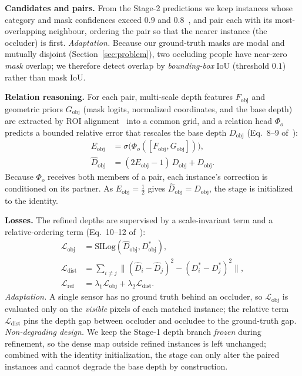 \documentclass[sigconf, review=true]{acmart}
\begin{document}
\smallskip\noindent\textbf{Candidates and pairs.}
From the Stage-2 predictions we keep instances whose category and mask
confidences exceed $0.9$ and $0.8$~\cite{liang2025instancedepth}, and pair each
with its most-overlapping neighbour, ordering the pair so that the nearer
instance (the occluder) is first. \emph{Adaptation.} Because our ground-truth
masks are modal and mutually disjoint (Section~\ref{sec:problem}), two occluding
people have near-zero \emph{mask} overlap; we therefore detect overlap by
\emph{bounding-box} IoU (threshold $0.1$) rather than mask IoU.

\smallskip\noindent\textbf{Relation reasoning.}
For each pair, multi-scale depth features $F_{\mathrm{obj}}$ and geometric priors
$G_{\mathrm{obj}}$ (mask logits, normalized coordinates, and the base depth) are
extracted by ROI alignment~\cite{he2017maskrcnn} into a common grid, and a
relation head $\Phi_o$ predicts a bounded relative error that rescales the base
depth $D_{\mathrm{obj}}$ (Eq.~8--9 of~\cite{liang2025instancedepth}):
\begin{align}
\label{eq:eobj}
E_{\mathrm{obj}} &= \sigma\big(\Phi_o([F_{\mathrm{obj}}, G_{\mathrm{obj}}])\big),\\
\hat D_{\mathrm{obj}} &= (2E_{\mathrm{obj}}-1)\,D_{\mathrm{obj}} + D_{\mathrm{obj}}.
\end{align}
Because $\Phi_o$ receives both members of a pair, each instance's correction is
conditioned on its partner. As $E_{\mathrm{obj}}=\tfrac12$ gives
$\hat D_{\mathrm{obj}}=D_{\mathrm{obj}}$, the stage is initialized to the
identity.

\smallskip\noindent\textbf{Losses.}
The refined depths are supervised by a scale-invariant term and a
relative-ordering term (Eq.~10--12 of~\cite{liang2025instancedepth}):
\begin{align}
\mathcal{L}_{\mathrm{obj}} &= \mathrm{SILog}(\hat D_{\mathrm{obj}}, D^{*}_{\mathrm{obj}}),\\
\mathcal{L}_{\mathrm{dist}} &= \sum_{i\neq j}\big\lVert(\hat D_i-\hat D_j)^2-(D^{*}_i-D^{*}_j)^2\big\rVert,\\
\mathcal{L}_{\mathrm{ref}} &= \lambda_1\mathcal{L}_{\mathrm{obj}} + \lambda_2\mathcal{L}_{\mathrm{dist}}.
\end{align}
\emph{Adaptation.} A single sensor has no ground truth behind an occluder, so
$\mathcal{L}_{\mathrm{obj}}$ is evaluated only on the \emph{visible} pixels of
each matched instance; the relative term $\mathcal{L}_{\mathrm{dist}}$ pins the
depth gap between occluder and occludee to the ground-truth gap.
\emph{Non-degrading design.} We keep the Stage-1 depth branch \emph{frozen}
during refinement, so the dense map outside refined instances is left unchanged;
combined with the identity initialization, the stage can only alter the paired
instances and cannot degrade the base depth by construction.
\end{document}
